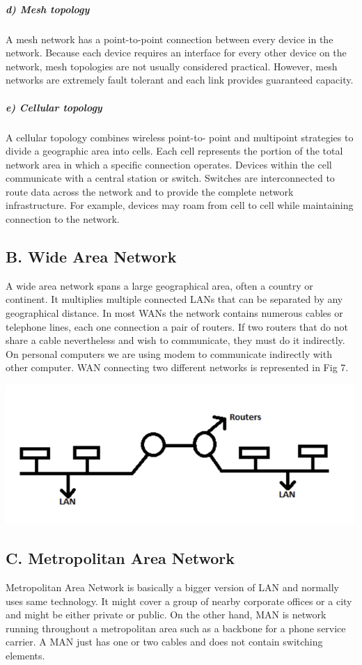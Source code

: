 \documentclass[12pt]{article}
\newenvironment{Figure}
  {\par\medskip\noindent\minipage{\linewidth}}
  {\endminipage\par\medskip}
\begin{document}
\begin{multicols*}{2}
\subparagraph{d) Mesh topology}
\indent A mesh network has a point-to-point connection
between every device in the network. Because each device requires an interface for every other device on
the network, mesh topologies are not usually considered
practical. However, mesh networks are extremely fault
tolerant and each link provides guaranteed capacity.

\subparagraph{e) Cellular topology}
\indent A cellular topology combines wireless point-to-
point and multipoint strategies to divide a geographic
area into cells. Each cell represents the portion of the
total network area in which a specific connection
operates. Devices within the cell communicate with a
central station or switch. Switches are interconnected to
route data across the network and to provide the
complete network infrastructure. For example, devices
may roam from cell to cell while maintaining
connection to the network.

\subsection*{B. Wide Area Network}
\indent \indent A wide area network spans a large geographical
area, often a country or continent. It multiplies multiple
connected LANs that can be separated by any
geographical distance. In most WANs the network
contains numerous cables or telephone lines, each one
connection a pair of routers. If two routers that do not
share a cable nevertheless and wish to communicate,
they must do it indirectly. On personal computers we
are using modem to communicate indirectly with other
computer. WAN connecting two different networks is
represented in Fig 7.

\begin{Figure}
 \centering
 \includegraphics[width=\linewidth]{wan.png}
\end{Figure}

\subsection*{C. Metropolitan Area Network}
\indent \indent Metropolitan Area Network is basically a
bigger version of LAN and normally uses same
technology. It might cover a group of nearby corporate
offices or a city and might be either private or public.
On the other hand, MAN is network running throughout
a metropolitan area such as a backbone for a phone
service carrier. A MAN just has one or two cables and
does not contain switching elements.


\end{multicols*}
\end{document}
